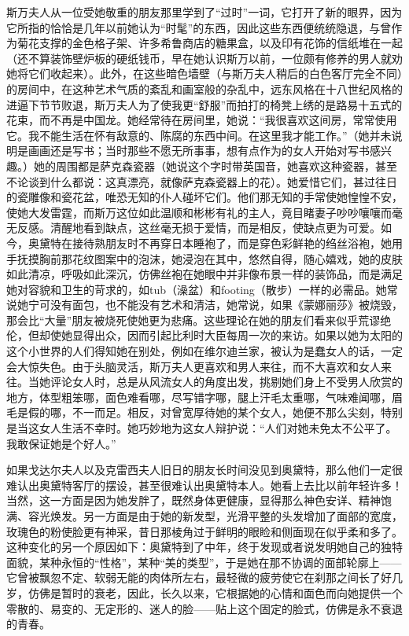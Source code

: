 \par 斯万夫人从一位受她敬重的朋友那里学到了“过时”一词，它打开了新的眼界，因为它所指的恰恰是几年以前她认为“时髦”的东西，因此这些东西便统统隐退，与曾作为菊花支撑的金色格子架、许多希鲁商店的糖果盒，以及印有花饰的信纸堆在一起（还不算装饰壁炉板的硬纸钱币，早在她认识斯万以前，一位颇有修养的男人就劝她将它们收起来）。此外，在这些暗色墙壁（与斯万夫人稍后的白色客厅完全不同）的房间中，在这种艺术气质的紊乱和画室般的杂乱中，远东风格在十八世纪风格的进逼下节节败退，斯万夫人为了使我更“舒服”而拍打的椅凳上绣的是路易十五式的花束，而不再是中国龙。她经常待在房间里，她说：“我很喜欢这间房，常常使用它。我不能生活在怀有敌意的、陈腐的东西中间。在这里我才能工作。”（她并未说明是画画还是写书；当时那些不愿无所事事，想有点作为的女人开始对写书感兴趣。）她的周围都是萨克森瓷器（她说这个字时带英国音，她喜欢这种瓷器，甚至不论谈到什么都说：这真漂亮，就像萨克森瓷器上的花）。她爱惜它们，甚过往日的瓷雕像和瓷花盆，唯恐无知的仆人碰坏它们。他们那无知的手常使她惶惶不安，使她大发雷霆，而斯万这位如此温顺和彬彬有礼的主人，竟目睹妻子吵吵嚷嚷而毫无反感。清醒地看到缺点，这丝毫无损于爱情，而是相反，使缺点更为可爱。如今，奥黛特在接待熟朋友时不再穿日本睡袍了，而是穿色彩鲜艳的绉丝浴袍，她用手抚摸胸前那花纹图案中的泡沫，她浸泡在其中，悠然自得，随心嬉戏，她的皮肤如此清凉，呼吸如此深沉，仿佛丝袍在她眼中并非像布景一样的装饰品，而是满足她对容貌和卫生的苛求的，如tub（澡盆）和footing（散步）一样的必需品。她常说她宁可没有面包，也不能没有艺术和清洁，她常说，如果《蒙娜丽莎》被烧毁，那会比“大量”朋友被烧死使她更为悲痛。这些理论在她的朋友们看来似乎荒谬绝伦，但却使她显得出众，因而引起比利时大臣每周一次的来访。如果以她为太阳的这个小世界的人们得知她在别处，例如在维尔迪兰家，被认为是蠢女人的话，一定会大惊失色。由于头脑灵活，斯万夫人更喜欢和男人来往，而不大喜欢和女人来往。当她评论女人时，总是从风流女人的角度出发，挑剔她们身上不受男人欣赏的地方，体型粗笨哪，面色难看哪，尽写错字哪，腿上汗毛太重哪，气味难闻哪，眉毛是假的哪，不一而足。相反，对曾宽厚待她的某个女人，她便不那么尖刻，特别是当这女人生活不幸时。她巧妙地为这女人辩护说：“人们对她未免太不公平了。我敢保证她是个好人。”
\par 如果戈达尔夫人以及克雷西夫人旧日的朋友长时间没见到奥黛特，那么他们一定很难认出奥黛特客厅的摆设，甚至很难认出奥黛特本人。她看上去比以前年轻许多！当然，这一方面是因为她发胖了，既然身体更健康，显得那么神色安详、精神饱满、容光焕发。另一方面是由于她的新发型，光滑平整的头发增加了面部的宽度，玫瑰色的粉使脸更有神采，昔日那棱角过于鲜明的眼睑和侧面现在似乎柔和多了。这种变化的另一个原因如下：奥黛特到了中年，终于发现或者说发明她自己的独特面貌，某种永恒的“性格”，某种“美的类型”，于是她在那不协调的面部轮廓上——它曾被飘忽不定、软弱无能的肉体所左右，最轻微的疲劳使它在刹那之间长了好几岁，仿佛是暂时的衰老，因此，长久以来，它根据她的心情和面色而向她提供一个零散的、易变的、无定形的、迷人的脸——贴上这个固定的脸式，仿佛是永不衰退的青春。
